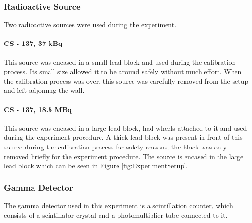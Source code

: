 		\subsubsection{Radioactive Source}
			
			Two radioactive sources were used during the experiment.
			
			\paragraph{CS - 137, 37 kBq}
			This source was encased in a small lead block and used during the calibration process. Its small size allowed it to be  around safely without much effort. When the calibration process was over, this source was carefully removed from the setup and left adjoining the wall.
			
			\paragraph{CS - 137, 18.5 MBq}
			This source was encased in a large lead block, had wheels attached to it and used during the experiment procedure. A thick lead block was present in front of this source during the calibration process for safety reasons, the block was only removed briefly for the experiment procedure. The source is encased in the large lead block which can be seen in Figure \ref{fig:ExperimentSetup}.
		
		\subsubsection{Gamma Detector}
			The gamma detector used in this experiment is a scintillation counter, which consists of a scintillator crystal and a photomultiplier tube connected to it.
